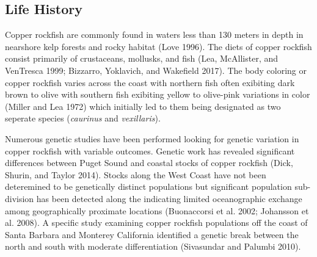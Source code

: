 \documentclass[11pt,
  english,
  a4paper,
]{article}
\begin{document}
\hypertarget{life-history}{%
\subsection{Life History}\label{life-history}}

\leavevmode\tagmcend\tagstructend


Copper rockfish are commonly found in waters less than 130 meters in depth in nearshore kelp forests and rocky habitat {(Love 1996)\leavevmode\tagmcend\tagstructend}. The diets of copper rockfish consist primarily of crustaceans, mollusks, and fish {(Lea, McAllister, and VenTresca 1999; Bizzarro, Yoklavich, and Wakefield 2017)\leavevmode\tagmcend\tagstructend}. The body coloring or copper rockfish varies across the coast with northern fish often exibiting dark brown to olive with southern fish exibiting yellow to olive-pink variations in color {(Miller and Lea 1972)\leavevmode\tagmcend\tagstructend} which initially led to them being designated as two seperate species (\emph{caurinus} and \emph{vexillaris}).

\leavevmode\tagmcend\tagstructend\par


Numerous genetic studies have been performed looking for genetic variation in copper rockfish with variable outcomes. Genetic work has revealed significant differences between Puget Sound and coastal stocks of copper rockfish {(Dick, Shurin, and Taylor 2014)\leavevmode\tagmcend\tagstructend}. Stocks along the West Coast have not been deteremined to be genetically distinct populations but significant population sub-division has been detected along the indicating limited oceanographic exchange among geographically proximate locations {(Buonaccorsi et al. 2002; Johansson et al. 2008)\leavevmode\tagmcend\tagstructend}. A specific study examining copper rockfish populations off the coast of Santa Barbara and Monterey California identified a genetic break between the north and south with moderate differentiation {(Sivasundar and Palumbi 2010)\leavevmode\tagmcend\tagstructend}.
\end{document}
